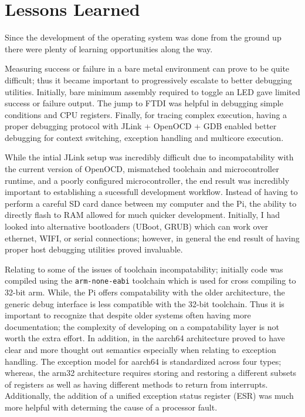 \documentclass[11pt]{article}
\begin{document}
\section{Lessons Learned}
\label{sec:lessons}
Since the development of the operating system was done from the ground up there were plenty of learning opportunities along the way.  


Measuring success or failure in a bare metal environment can prove to be quite difficult; thus it became important to progressively escalate to better debugging utilities.  Initially, bare minimum assembly required to toggle an LED gave limited success or failure output.  The jump to FTDI was helpful in debugging simple conditions and CPU registers.  Finally, for tracing complex execution, having a proper debugging protocol with JLink + OpenOCD + GDB enabled better debugging for context switching, exception handling and multicore execution.

While the intial JLink setup was incredibly difficult due to incompatability with the current version of OpenOCD, mismatched toolchain and microcontroller runtime, and a poorly configured microcontroller, the end result was incredibly important to establishing a sucessfull development workflow.  Instead of having to perform a careful SD card dance between my computer and the Pi, the ability to directly flash to RAM allowed for much quicker development.  Initially, I had looked into alternative bootloaders (UBoot, GRUB) which can work over ethernet, WIFI, or serial connections; however, in general the end result of having proper host debugging utilities proved invaluable.

Relating to some of the issues of toolchain incompatability; initially code was compiled using the \texttt{arm-none-eabi} toolchain which is used for cross compiling to 32-bit arm.  While, the Pi offers compatability with the older architecture, the generic debug interface is less compatible with the 32-bit toolchain.  Thus it is important to recognize that despite older systems often having more documentation; the complexity of developing on a compatability layer is not worth the extra effort.  In addition, in the aarch64 architecture proved to have clear and more thought out semantics especially when relating to exception handling.  The exception model for aarch64 is standardized across four types; whereas, the arm32 architecture requires storing and restoring a different subsets of registers as well as having different methods to return from interrupts.  Additionally, the addition of a unified exception status register (ESR) was much more helpful with determing the cause of a processor fault.
\end{document}
